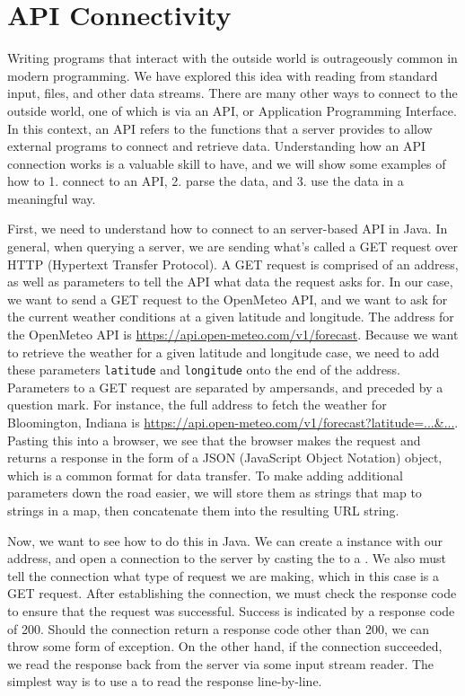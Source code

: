 \section{API Connectivity}
Writing programs that interact with the outside world is outrageously common in modern programming. We have explored this idea with reading from standard input, files, and other data streams. There are many other ways to connect to the outside world, one of which is via an API, or Application Programming Interface. In this context, an API refers to the functions that a server provides to allow external programs to connect and retrieve data. Understanding how an API connection works is a valuable skill to have, and we will show some examples of how to 1. connect to an API, 2. parse the data, and 3. use the data in a meaningful way.


First, we need to understand how to connect to an server-based API in Java. In general, when querying a server, we are sending what's called a GET request over HTTP (Hypertext Transfer Protocol). A GET request is comprised of an address, as well as parameters to tell the API what data the request asks for. In our case, we want to send a GET request to the OpenMeteo API, and we want to ask for the current weather conditions at a given latitude and longitude. The address for the OpenMeteo API is \url{https://api.open-meteo.com/v1/forecast}. Because we want to retrieve the weather for a given latitude and longitude case, we need to add these parameters \texttt{latitude} and \texttt{longitude} onto the end of the address. Parameters to a GET request are separated by ampersands, and preceded by a question mark. For instance, the full address to fetch the weather for Bloomington, Indiana is \url{https://api.open-meteo.com/v1/forecast?latitude=...\&...}. Pasting this into a browser, we see that the browser makes the request and returns a response in the form of a JSON (JavaScript Object Notation) object, which is a common format for data transfer. To make adding additional parameters down the road easier, we will store them as strings that map to strings in a map, then concatenate them into the resulting URL string.

Now, we want to see how to do this in Java. We can create a  instance with our address, and open a connection to the server by casting the  to a . We also must tell the connection what type of request we are making, which in this case is a GET request. After establishing the connection, we must check the response code to ensure that the request was successful. Success is indicated by a response code of 200. Should the connection return a response code other than 200, we can throw some form of exception. On the other hand, if the connection succeeded, we read the response back from the server via some input stream reader. The simplest way is to use a  to read the response line-by-line.

